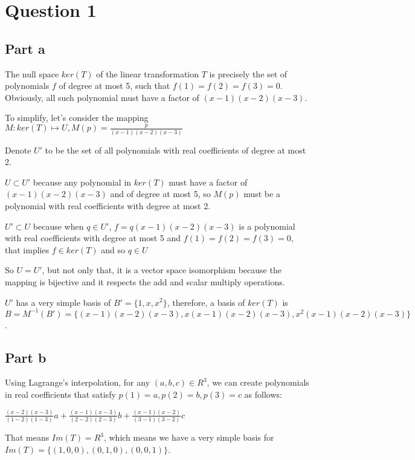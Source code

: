 \section*{Question 1}
\subsection*{Part a}
The null space $ ker(T) $ of the linear transformation $ T $ is precisely the set of polynomials $ f $ of degree at most 5, such that $ f(1) = f(2) = f(3) = 0 $. Obviously, all such polynomial must have a factor of $ (x - 1)(x - 2)(x - 3) $. 

To simplify, let's consider the mapping $ M : ker(T) \mapsto U, M(p) = \frac{p}{(x - 1)(x - 2)(x - 3)} $

Denote $ U' $ to be the set of all polynomials with real coefficients of degree at most 2.

$ U \subset U' $ because any polynomial in $ ker(T) $ must have a factor of $ (x - 1)(x - 2)(x - 3) $ and of degree at most 5, so $ M(p) $ must be a polynomial with real coefficients with degree at most 2.

$ U' \subset U $ because when $ q \in U' $, $ f = q(x - 1)(x - 2)(x - 3) $ is a polynomial with real coefficients with degree at most 5 and $ f(1) = f(2) = f(3) = 0 $, that implies $ f \in ker(T) $ and so $ q \in U $

So $ U = U' $, but not only that, it is a vector space isomorphism because the mapping is bijective and it respects the add and scalar multiply operations.

$ U' $ has a very simple basis of $ B' = \{1, x, x^2 \} $, therefore, a basis of $ ker(T) $ is $ B = M^{-1}(B') = \{(x - 1)(x - 2)(x - 3), x(x - 1)(x - 2)(x - 3), x^2(x - 1)(x - 2)(x - 3) \} $.

\subsection*{Part b}
Using Lagrange's interpolation, for any $ (a,b,c) \in R^3 $, we can create polynomials in real coefficients that satisfy $ p(1) = a, p(2) = b, p(3) = c $ as follows:

$ \frac{(x-2)(x-3)}{(1-2)(1-3)}a + \frac{(x-1)(x-3)}{(2-2)(2-3)}b + \frac{(x-1)(x-2)}{(3-1)(3-2)}c $

That means $ Im(T) = R^3 $, which means we have a very simple basis for $ Im(T) = \{(1,0,0), (0,1,0), (0,0,1) \} $.